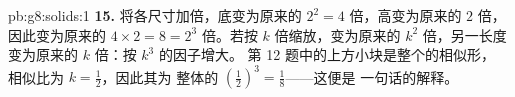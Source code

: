 \begin{solution}{pb:g8:solids:1}
\textbf{15.} 将各尺寸加倍，底变为原来的
$2^2 = 4$ 倍，高变为原来的 $2$ 倍，因此变为原来的
$4 \times 2 = 8 = 2^3$ 倍。若按 $k$ 倍缩放，变为原来的 $k^2$
倍，另一长度变为原来的 $k$ 倍：按 $k^3$ 的因子增大。
第 12 题中的上方小块是整个的相似形，
相似比为 $k = \frac12$，因此其为
整体的 $\left(\frac12\right)^3 = \frac18$——这便是
一句话的解释。
\end{solution}
